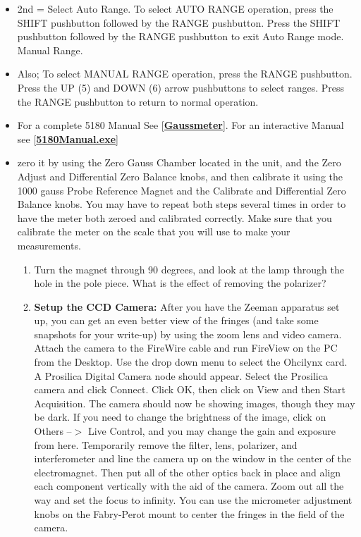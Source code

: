 \documentclass{../lab}
\begin{document}
\begin{enumerate}
\begin{itemize}
\begin{itemize}
            \item 2nd = Select Auto Range. To select AUTO RANGE operation, press the SHIFT pushbutton followed by the RANGE pushbutton. Press the SHIFT pushbutton followed by the RANGE pushbutton to exit Auto Range mode. Manual Range.
            
            \item Also; To select MANUAL RANGE operation, press the RANGE pushbutton. Press the UP (5) and DOWN (6) arrow pushbuttons to select ranges. Press the RANGE pushbutton to return to normal operation.
            
            \item For a complete 5180 Manual See [\href{http://physics111.lib.berkeley.edu/Physics111/Equipment\_Manuals/Gaussmeter5180.pdf}{\textbf{Gaussmeter}}]. For an interactive Manual see [\href{http://physics111.lib.berkeley.edu/Physics111/Reprints/HAL/5180Manual.exe}{\textbf{5180Manual.exe}}]
            
            \item zero it by using the Zero Gauss Chamber located in the unit, and the Zero Adjust and Differential Zero Balance knobs, and then calibrate it using the 1000 gauss Probe Reference Magnet and the Calibrate and Differential Zero Balance knobs. You may have to repeat both steps several times in order to have the meter both zeroed and calibrated correctly. Make sure that you calibrate the meter on the scale that you will use to make your measurements.
            \begin{enumerate}
                \item Turn the magnet through 90 degrees, and look at the lamp through the hole in the pole piece. What is the effect of removing the polarizer?
            
                \item \textbf{Setup the CCD Camera:} After you have the Zeeman apparatus set up, you can get an even better view of the fringes (and take some snapshots for your write-up) by using the zoom lens and video camera. Attach the camera to the FireWire cable and run FireView on the PC from the Desktop. Use the drop down menu to select the Ohcilynx card. A Prosilica Digital Camera node should appear. Select the Prosilica camera and click Connect. Click OK, then click on View and then Start Acquisition. The camera should now be showing images, though they may be dark. If you need to change the brightness of the image, click on Others --$>$ Live Control, and you may change the gain and exposure from here. Temporarily remove the filter, lens, polarizer, and interferometer and line the camera up on the window in the center of the electromagnet. Then put all of the other optics back in place and align each component vertically with the aid of the camera. Zoom out all the way and set the focus to infinity. You can use the micrometer adjustment knobs on the Fabry-Perot mount to center the fringes in the field of the camera.
            

\end{enumerate}
\end{itemize}
\end{itemize}
\end{enumerate}
\end{document}
